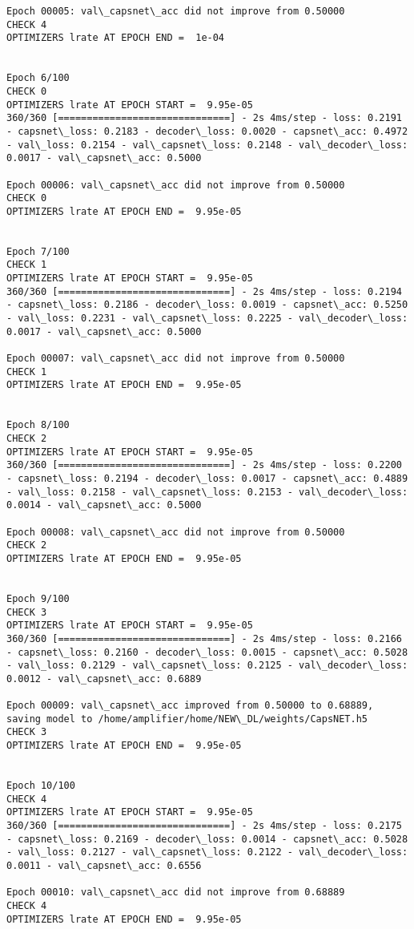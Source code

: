 \documentclass[11pt]{article}
\begin{document}
\begin{Verbatim}[commandchars=\\\{\}]
Epoch 00005: val\_capsnet\_acc did not improve from 0.50000
CHECK 4
OPTIMIZERS lrate AT EPOCH END =  1e-04 


Epoch 6/100
CHECK 0
OPTIMIZERS lrate AT EPOCH START =  9.95e-05
360/360 [==============================] - 2s 4ms/step - loss: 0.2191 - capsnet\_loss: 0.2183 - decoder\_loss: 0.0020 - capsnet\_acc: 0.4972 - val\_loss: 0.2154 - val\_capsnet\_loss: 0.2148 - val\_decoder\_loss: 0.0017 - val\_capsnet\_acc: 0.5000

Epoch 00006: val\_capsnet\_acc did not improve from 0.50000
CHECK 0
OPTIMIZERS lrate AT EPOCH END =  9.95e-05 


Epoch 7/100
CHECK 1
OPTIMIZERS lrate AT EPOCH START =  9.95e-05
360/360 [==============================] - 2s 4ms/step - loss: 0.2194 - capsnet\_loss: 0.2186 - decoder\_loss: 0.0019 - capsnet\_acc: 0.5250 - val\_loss: 0.2231 - val\_capsnet\_loss: 0.2225 - val\_decoder\_loss: 0.0017 - val\_capsnet\_acc: 0.5000

Epoch 00007: val\_capsnet\_acc did not improve from 0.50000
CHECK 1
OPTIMIZERS lrate AT EPOCH END =  9.95e-05 


Epoch 8/100
CHECK 2
OPTIMIZERS lrate AT EPOCH START =  9.95e-05
360/360 [==============================] - 2s 4ms/step - loss: 0.2200 - capsnet\_loss: 0.2194 - decoder\_loss: 0.0017 - capsnet\_acc: 0.4889 - val\_loss: 0.2158 - val\_capsnet\_loss: 0.2153 - val\_decoder\_loss: 0.0014 - val\_capsnet\_acc: 0.5000

Epoch 00008: val\_capsnet\_acc did not improve from 0.50000
CHECK 2
OPTIMIZERS lrate AT EPOCH END =  9.95e-05 


Epoch 9/100
CHECK 3
OPTIMIZERS lrate AT EPOCH START =  9.95e-05
360/360 [==============================] - 2s 4ms/step - loss: 0.2166 - capsnet\_loss: 0.2160 - decoder\_loss: 0.0015 - capsnet\_acc: 0.5028 - val\_loss: 0.2129 - val\_capsnet\_loss: 0.2125 - val\_decoder\_loss: 0.0012 - val\_capsnet\_acc: 0.6889

Epoch 00009: val\_capsnet\_acc improved from 0.50000 to 0.68889, saving model to /home/amplifier/home/NEW\_DL/weights/CapsNET.h5
CHECK 3
OPTIMIZERS lrate AT EPOCH END =  9.95e-05 


Epoch 10/100
CHECK 4
OPTIMIZERS lrate AT EPOCH START =  9.95e-05
360/360 [==============================] - 2s 4ms/step - loss: 0.2175 - capsnet\_loss: 0.2169 - decoder\_loss: 0.0014 - capsnet\_acc: 0.5028 - val\_loss: 0.2127 - val\_capsnet\_loss: 0.2122 - val\_decoder\_loss: 0.0011 - val\_capsnet\_acc: 0.6556

Epoch 00010: val\_capsnet\_acc did not improve from 0.68889
CHECK 4
OPTIMIZERS lrate AT EPOCH END =  9.95e-05 



\end{Verbatim}
\end{document}
